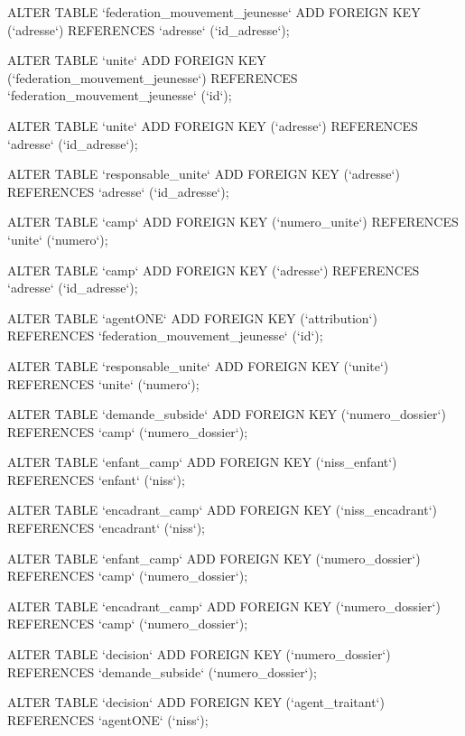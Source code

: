 ALTER TABLE `federation_mouvement_jeunesse` ADD FOREIGN KEY (`adresse`) REFERENCES `adresse` (`id_adresse`);

ALTER TABLE `unite` ADD FOREIGN KEY (`federation_mouvement_jeunesse`) REFERENCES `federation_mouvement_jeunesse` (`id`);

ALTER TABLE `unite` ADD FOREIGN KEY (`adresse`) REFERENCES `adresse` (`id_adresse`);

ALTER TABLE `responsable_unite` ADD FOREIGN KEY (`adresse`) REFERENCES `adresse` (`id_adresse`);

ALTER TABLE `camp` ADD FOREIGN KEY (`numero_unite`) REFERENCES `unite` (`numero`);

ALTER TABLE `camp` ADD FOREIGN KEY (`adresse`) REFERENCES `adresse` (`id_adresse`);

ALTER TABLE `agentONE` ADD FOREIGN KEY (`attribution`) REFERENCES `federation_mouvement_jeunesse` (`id`);

ALTER TABLE `responsable_unite` ADD FOREIGN KEY (`unite`) REFERENCES `unite` (`numero`);

ALTER TABLE `demande_subside` ADD FOREIGN KEY (`numero_dossier`) REFERENCES `camp` (`numero_dossier`);

ALTER TABLE `enfant_camp` ADD FOREIGN KEY (`niss_enfant`) REFERENCES `enfant` (`niss`);

ALTER TABLE `encadrant_camp` ADD FOREIGN KEY (`niss_encadrant`) REFERENCES `encadrant` (`niss`);

ALTER TABLE `enfant_camp` ADD FOREIGN KEY (`numero_dossier`) REFERENCES `camp` (`numero_dossier`);

ALTER TABLE `encadrant_camp` ADD FOREIGN KEY (`numero_dossier`) REFERENCES `camp` (`numero_dossier`);

ALTER TABLE `decision` ADD FOREIGN KEY (`numero_dossier`) REFERENCES `demande_subside` (`numero_dossier`);

ALTER TABLE `decision` ADD FOREIGN KEY (`agent_traitant`) REFERENCES `agentONE` (`niss`);